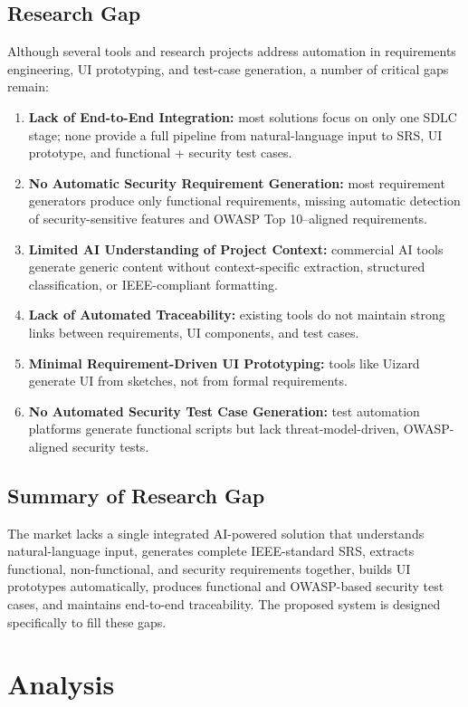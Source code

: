 \documentclass[12pt,a4paper,oneside]{report}
\begin{document}
\section{Research Gap}
Although several tools and research projects address automation in requirements engineering, UI prototyping, and test-case generation, a number of critical gaps remain:
\begin{enumerate}[leftmargin=*]
  \item \textbf{Lack of End-to-End Integration:} most solutions focus on only one SDLC stage; none provide a full pipeline from natural-language input to SRS, UI prototype, and functional + security test cases.
  \item \textbf{No Automatic Security Requirement Generation:} most requirement generators produce only functional requirements, missing automatic detection of security-sensitive features and OWASP Top 10--aligned requirements.
  \item \textbf{Limited AI Understanding of Project Context:} commercial AI tools generate generic content without context-specific extraction, structured classification, or IEEE-compliant formatting.
  \item \textbf{Lack of Automated Traceability:} existing tools do not maintain strong links between requirements, UI components, and test cases.
  \item \textbf{Minimal Requirement-Driven UI Prototyping:} tools like Uizard generate UI from sketches, not from formal requirements.
  \item \textbf{No Automated Security Test Case Generation:} test automation platforms generate functional scripts but lack threat-model-driven, OWASP-aligned security tests.
\end{enumerate}

\section{Summary of Research Gap}
The market lacks a single integrated AI-powered solution that understands natural-language input, generates complete IEEE-standard SRS, extracts functional, non-functional, and security requirements together, builds UI prototypes automatically, produces functional and OWASP-based security test cases, and maintains end-to-end traceability. The proposed system is designed specifically to fill these gaps.

\chapter{Analysis}
\end{document}
